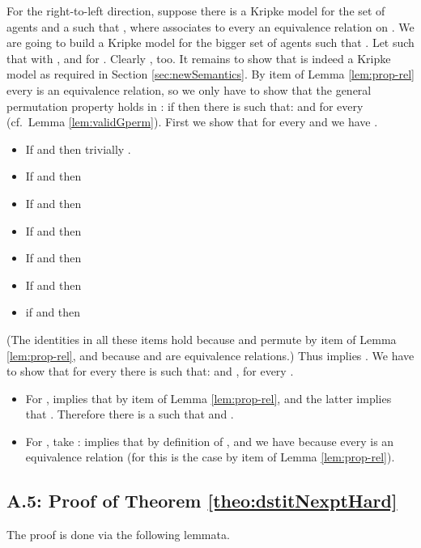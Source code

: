 \documentclass{article}
\begin{document}
For the right-to-left direction, suppose there is a Kripke model
 for the set of agents  and a  such that
, where 
associates to every  an equivalence relation  on .
We are going to build a Kripke model  for the bigger set of agents 
such that .
Let  such that
 with
,
 and
 for .
Clearly , too.
It remains to show that  is indeed a Kripke model
as required in Section \ref{sec:newSemantics}.
By item  of Lemma \ref{lem:prop-rel}
every  is an equivalence relation, so we only have to show that
the general permutation property holds in :
if  then
there is  such that:
 and 
for every 
(cf.\ Lemma \ref{lem:validGperm}).
First we show that for every  and 
we have .
\begin{itemize}
\item If  and  then trivially
.
\item If  and  then

\item If  and  then

\item If  and  then

\item If  and  then

\item If  and  then

\item if  and  then

\end{itemize}
(The identities in all these items hold because
 and  permute by item  of Lemma \ref{lem:prop-rel}, and
because  and  are equivalence relations.)
Thus  implies .
We have to show that for every  there is  such that:
 and , for every .
\begin{itemize}
\item
For ,  implies that
 by item  of Lemma \ref{lem:prop-rel},
and the latter implies that .
Therefore there is a  such that  and .
\item
For , take :
 implies that  by definition of , and
we have  because every  is an equivalence relation
(for  this is the case by item  of Lemma \ref{lem:prop-rel}).
\end{itemize}




\subsection*{A.5: Proof of Theorem \ref{theo:dstitNexptHard}}

The proof is done via the following lemmata.
\end{document}
